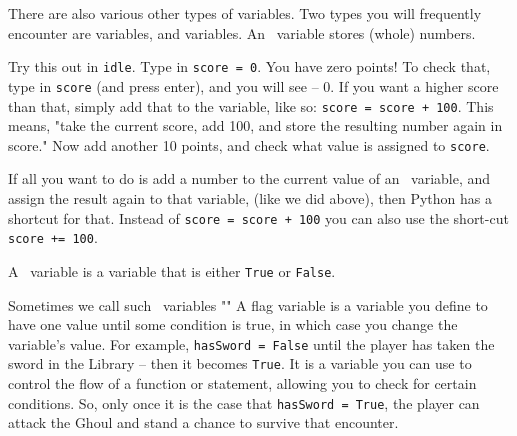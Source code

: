 There are also various other types of variables. Two types you will frequently encounter are \textit{\integer} variables, and \textit{\boolean} variables. An \integer\ variable stores (whole) numbers. 

 \begin{Exe} 
Try this out in \texttt{idle}. Type in \texttt{score = 0}. You have zero points! To check that, type in \texttt{score} (and press enter), and you will see -- 0. If you want a higher score than that, simply add that to the variable, like so: \texttt{score = score + 100}. This means, "take the current score, add 100, and store the resulting number again in score." Now add another 10 points, and check what value is assigned to \texttt{score}. \expend
\end{Exe}

\begin{Exp} 
If all you want to do is add a number to the current value of an \integer\ variable, and assign the result again to that variable, (like we did above), then Python has a shortcut for that. Instead of \texttt{score = score + 100} you can also use the short-cut \texttt{score += 100}. \expend
\end{Exp} 
 
A \boolean\ variable is a variable that is either \texttt{True} or \texttt{False}. 

\begin{Exp}[Flags] 
Sometimes we call such \boolean\ variables ""  A flag variable is a variable you define to have one value until some condition is true, in which case you change the variable's value. For example, \texttt{hasSword = False} until the player has taken the sword in the Library -- then it becomes \texttt{True}.  It is a variable you can use to control the flow of a function or statement, allowing you to check for certain conditions. So, only once it is the case that \texttt{hasSword = True}, the player can attack the Ghoul and stand a chance to survive that encounter. \expend
\end{Exp} 





 






 

 

      


 



  